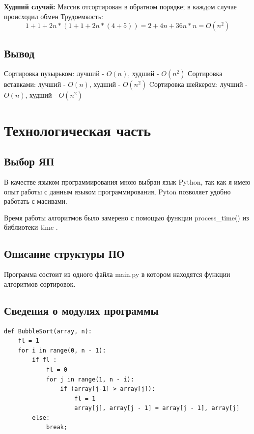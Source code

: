 \documentclass[12pt]{report}
\begin{document}
\textbf{Худший случай:}  Массив отсортирован в обратном порядке; в каждом случае происходил обмен\newline
Трудоемкость: \begin{equation}1+1+2n * (1 + 1 + 2n*(4+5)) = 2 + 4n + 36 n*n = O(n^2)\end{equation}


\section{Вывод}
Сортировка пузырьком: лучший - $O(n)$, худший - $O(n^2)$ \newline
Сортировка вставками: лучший - $O(n)$, худший - $O(n^2)$ \newline
Cортировка шейкером: лучший - $O(n)$, худший - $O(n^2)$ \newline

\chapter{Технологическая часть}
\section{Выбор ЯП}
В качестве языком программирования мною выбран язык Python, так как я имею опыт работы с данным языком программирования, Pyton позволяет удобно работать с масивами.

Время работы алгоритмов было замерено с помощью функции process\_time() из библиотеки time \cite{lit2}.


\section{Описание структуры ПО}
Программа состоит из одного файла main.py в котором находятся функции алгоритмов сортировок.

\section{Сведения о модулях программы}
\newpage
\begin{lstlisting}[label=some-code,caption=Сортировка пузырьком]
def BubbleSort(array, n):
    fl = 1
    for i in range(0, n - 1):
        if fl :
            fl = 0
            for j in range(1, n - i):
                if (array[j-1] > array[j]):
                    fl = 1
                    array[j], array[j - 1] = array[j - 1], array[j] 
        else:
            break;
\end{lstlisting}
\end{document}
